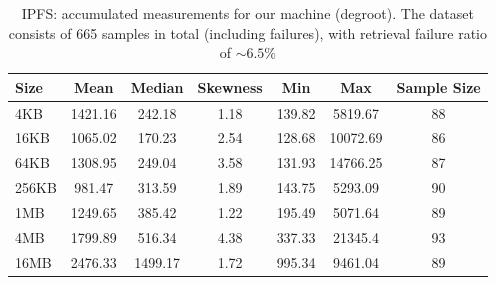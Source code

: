 


\begin{table}[H]
\centering
\begin{small}
\caption{IPFS: accumulated measurements for our machine (degroot). The dataset consists of 665 samples in total (including failures), with retrieval failure ratio of $\sim 6.5\%$ }
\label{tab:degroot_ipfs}
\begin{tabular}{@{}lcccccc@{}}
\toprule
Size & Mean & Median & Skewness & Min & Max & Sample Size \\ \midrule
4KB & 1421.16 & 242.18 & 1.18 & 139.82 & 5819.67 & 88\\
16KB & 1065.02 & 170.23 & 2.54 & 128.68 & 10072.69 & 86\\
64KB & 1308.95 & 249.04 & 3.58 & 131.93 & 14766.25 & 87\\
256KB & 981.47 & 313.59 & 1.89 & 143.75 & 5293.09 & 90\\
1MB & 1249.65 & 385.42 & 1.22 & 195.49 & 5071.64 & 89\\
4MB & 1799.89 & 516.34 & 4.38 & 337.33 & 21345.4 & 93\\
16MB & 2476.33 & 1499.17 & 1.72 & 995.34 & 9461.04 & 89\\
\bottomrule
\end{tabular}
\end{small}
\end{table}


